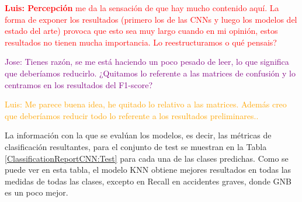 \documentclass{uathesis-es}
\begin{document}
{\textcolor{red}{\textbf{Luis: Percepción} me da la sensación de que hay mucho contenido aquí. La forma de exponer los resultados (primero los de las CNNs y luego los modelos del estado del arte) provoca que esto sea muy largo cuando en mi opinión, estos resultados no tienen mucha importancia. Lo reestructuramos o qué pensais?}

\textcolor{purple}{Jose: Tienes razón, se me está haciendo un poco pesado de leer, lo que significa que deberíamos reducirlo. ¿Quitamos lo referente a las matrices de confusión y lo centramos en los resultados del F1-score?}

\textcolor{orange}{Luis: Me parece buena idea, he quitado lo relativo a las matrices. Además creo que deberíamos reducir todo lo referente a los resultados preliminares..}




La información con la que se evalúan los modelos, es decir, las métricas de clasificación resultantes, para el conjunto de test se muestran en la Tabla \ref{ClassificationReportCNN:Test} para cada una de las clases predichas. Como se puede ver en esta tabla, el modelo KNN obtiene mejores resultados en todas las medidas de todas las clases, excepto en Recall en accidentes graves, donde GNB es un poco mejor.

}
\end{document}
